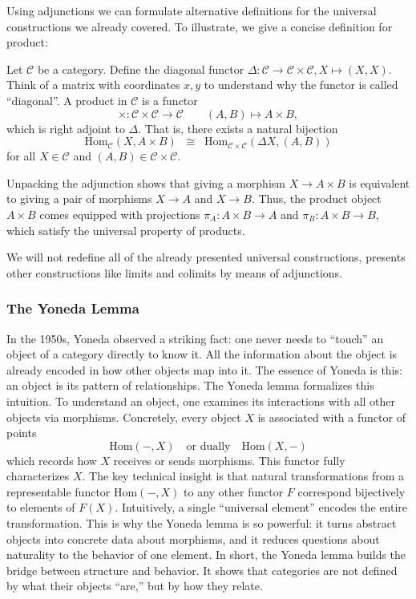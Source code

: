 Using adjunctions we can formulate alternative definitions for the universal constructions we already covered. To illustrate, we give a concise definition for product:

\begin{definition}
Let $\mathcal{C}$ be a category. 
Define the diagonal functor
\(
\Delta : \mathcal{C} \to \mathcal{C} \times \mathcal{C}, X \mapsto (X,X)
\). Think of a matrix with coordinates $x, y$ to understand why the functor is called ``diagonal''.
A product in $\mathcal{C}$ is a functor
\[
\times : \mathcal{C} \times \mathcal{C} \to \mathcal{C} \qquad (A,B) \mapsto A \times B,
\]
which is right adjoint to $\Delta$.  
That is, there exists a natural bijection
\[
\mathrm{Hom}_{\mathcal{C}}(X, A \times B) 
\;\;\cong\;\; 
\mathrm{Hom}_{\mathcal{C} \times \mathcal{C}}(\Delta X, (A,B))
\]
for all $X \in \mathcal{C}$ and $(A,B) \in \mathcal{C} \times \mathcal{C}$.
\end{definition}

\begin{remark}
Unpacking the adjunction shows that giving a morphism 
$X \to A \times B$ is equivalent to giving a pair of morphisms 
$X \to A$ and $X \to B$.  
Thus, the product object $A \times B$ comes equipped with projections 
$\pi_A : A \times B \to A$ and $\pi_B : A \times B \to B$, 
which satisfy the universal property of products.
\end{remark}

We will not redefine all of the already presented universal constructions, \cite{maclane1971categories} presents other constructions like limits and colimits by means of adjunctions.

\subsubsection{\centering The Yoneda Lemma}
In the 1950s, Yoneda observed a striking fact: one never needs to ``touch'' an
object of a category directly to know it. All the information about the object
is already encoded in how other objects map into it. The essence of Yoneda is
this: an object is its pattern of relationships.  
The Yoneda lemma formalizes this intuition. To understand an object, one
examines its interactions with all other objects via morphisms. Concretely,
every object $X$ is associated with a functor of points
\[
  \mathrm{Hom}(-,X) \quad \text{or dually} \quad \mathrm{Hom}(X,-)
\]
which records how $X$ receives or sends morphisms. This functor fully
characterizes $X$.   
The key technical insight is that natural transformations from a representable
functor $\mathrm{Hom}(-,X)$ to any other functor $F$ correspond bijectively to
elements of $F(X)$. Intuitively, a single ``universal element'' encodes the
entire transformation. This is why the Yoneda lemma is so powerful: it turns
abstract objects into concrete data about morphisms, and it reduces questions
about naturality to the behavior of one element.  
In short, the Yoneda lemma builds the bridge between structure
and behavior. It shows that categories are not defined by what their
objects ``are,'' but by how they relate.

